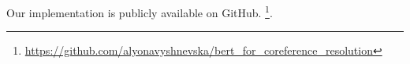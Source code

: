 \documentclass[11pt]{article}
\newcommand\todo[1]{\textcolor{red}{#1}}
\begin{document}









Our implementation is publicly available on GitHub.  \footnote{\url{https://github.com/alyonavyshnevska/bert_for_coreference_resolution}}.
\end{document}
